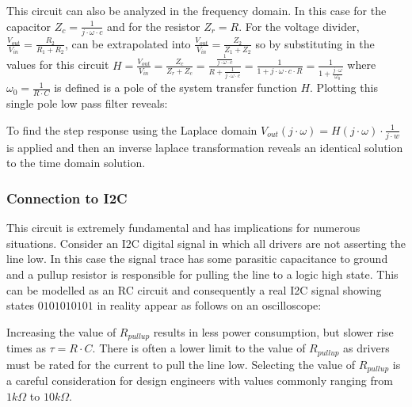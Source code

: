\documentclass[main.tex]{subfiles}
\begin{document}
This circuit can also be analyzed in the frequency domain. In this case for the capacitor $Z_c = \frac{1}{j \cdot \omega \cdot c}$ and for the resistor $Z_r = R$. For the voltage divider, $\frac{V_{out}}{V_{in}} = \frac{R_2}{R_1 + R_2}$, can be extrapolated into $\frac{V_{out}}{V_{in}} = \frac{Z_2}{Z_1 + Z_2}$ so by substituting in the values for this circuit $H = \frac{V_{out}}{V_{in}} = \frac{Z_c}{Z_r + Z_c} = \frac{\frac{1}{j \cdot \omega \cdot c}}{R + \frac{1}{j \cdot \omega \cdot c}} = \frac{1}{1 + j \cdot \omega \cdot c \cdot R} = \frac{1}{1+\frac{j \cdot \omega}{\omega_{0}}}$ where $\omega_{0} = \frac{1}{R \cdot C}$ is defined is a pole of the system transfer function $H$. Plotting this single pole low pass filter reveals:


To find the step response using the Laplace domain $V_{out}(j \cdot \omega) = H(j \cdot \omega) \cdot \frac{1}{j \cdot w}$ is applied and then an inverse laplace transformation reveals an identical solution to the time domain solution.

\subsubsection{Connection to I2C} %
This circuit is extremely fundamental and has implications for numerous situations. Consider an I2C digital signal in which all drivers are not asserting the line low. In this case the signal trace has some parasitic capacitance to ground and a pullup resistor is responsible for pulling the line to a logic high state. This can be modelled as an RC circuit and consequently a real I2C signal showing states $0101010101$ in reality appear as follows on an oscilloscope:


Increasing the value of $R_{pullup}$ results in less power consumption, but slower rise times as $\tau = R \cdot C$. There is often a lower limit to the value of $R_{pullup}$ as drivers must be rated for the current to pull the line low. Selecting the value of $R_{pullup}$ is a careful consideration for design engineers with values commonly ranging from $1 k \Omega$ to $10 k \Omega$.
\end{document}
